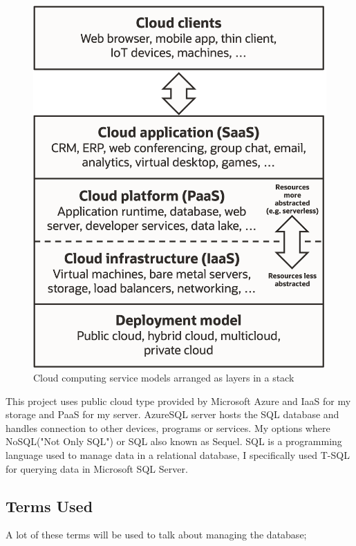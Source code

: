 \begin{figure}[ht]
  \centering
  \includegraphics[scale=0.8]{Background/images/Cloud_computing_service_models_(1).png}
  \caption{Cloud computing service models arranged as layers in a stack \cite{Cloudcom53:online}}
\end{figure}
This project uses public cloud type provided by Microsoft Azure and IaaS for my storage and PaaS for my server. AzureSQL server hosts the SQL database and handles connection to other devices, programs or services. 
My options where NoSQL("Not Only SQL") or SQL also known as Sequel.
SQL is a programming language used to manage data in a relational database, I specifically used T-SQL for querying data in Microsoft SQL Server. 

\subsection{Terms Used}
A lot of these terms will be used to talk about managing the database;

